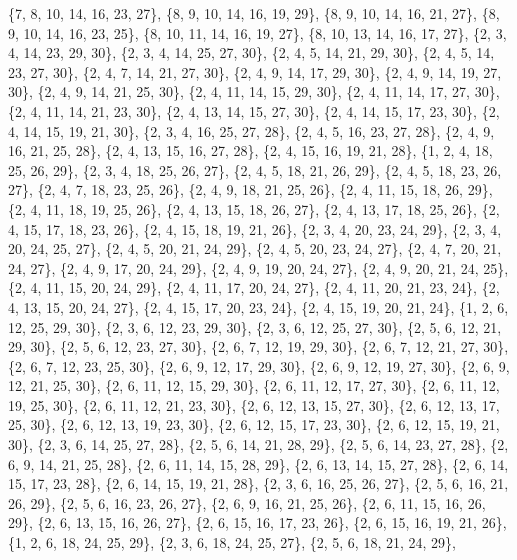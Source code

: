 \documentclass[11pt,a4paper]{article}
\begin{document}
{\{7, 8, 10, 14, 16, 23, 27\}, \{8, 9, 10, 14, 16, 19, 29\}, \{8, 9, 10, 14, 16, 21, 27\}, \{8, 9, 10, 14, 16, 23, 25\}, \{8, 10, 11, 14, 16, 19, 27\},
\{8, 10, 13, 14, 16, 17, 27\}, \{2, 3, 4, 14, 23, 29, 30\}, \{2, 3, 4, 14, 25, 27, 30\}, \{2, 4, 5, 14, 21, 29, 30\}, \{2, 4, 5, 14, 23, 27, 30\},
\{2, 4, 7, 14, 21, 27, 30\}, \{2, 4, 9, 14, 17, 29, 30\}, \{2, 4, 9, 14, 19, 27, 30\}, \{2, 4, 9, 14, 21, 25, 30\}, \{2, 4, 11, 14, 15, 29, 30\},
\{2, 4, 11, 14, 17, 27, 30\}, \{2, 4, 11, 14, 21, 23, 30\}, \{2, 4, 13, 14, 15, 27, 30\}, \{2, 4, 14, 15, 17, 23, 30\}, \{2, 4, 14, 15, 19, 21, 30\},
\{2, 3, 4, 16, 25, 27, 28\}, \{2, 4, 5, 16, 23, 27, 28\}, \{2, 4, 9, 16, 21, 25, 28\}, \{2, 4, 13, 15, 16, 27, 28\}, \{2, 4, 15, 16, 19, 21, 28\},
\{1, 2, 4, 18, 25, 26, 29\}, \{2, 3, 4, 18, 25, 26, 27\}, \{2, 4, 5, 18, 21, 26, 29\}, \{2, 4, 5, 18, 23, 26, 27\}, \{2, 4, 7, 18, 23, 25, 26\},
\{2, 4, 9, 18, 21, 25, 26\}, \{2, 4, 11, 15, 18, 26, 29\}, \{2, 4, 11, 18, 19, 25, 26\}, \{2, 4, 13, 15, 18, 26, 27\}, \{2, 4, 13, 17, 18, 25, 26\},
\{2, 4, 15, 17, 18, 23, 26\}, \{2, 4, 15, 18, 19, 21, 26\}, \{2, 3, 4, 20, 23, 24, 29\}, \{2, 3, 4, 20, 24, 25, 27\}, \{2, 4, 5, 20, 21, 24, 29\},
\{2, 4, 5, 20, 23, 24, 27\}, \{2, 4, 7, 20, 21, 24, 27\}, \{2, 4, 9, 17, 20, 24, 29\}, \{2, 4, 9, 19, 20, 24, 27\}, \{2, 4, 9, 20, 21, 24, 25\},
\{2, 4, 11, 15, 20, 24, 29\}, \{2, 4, 11, 17, 20, 24, 27\}, \{2, 4, 11, 20, 21, 23, 24\}, \{2, 4, 13, 15, 20, 24, 27\}, \{2, 4, 15, 17, 20, 23, 24\},
\{2, 4, 15, 19, 20, 21, 24\}, \{1, 2, 6, 12, 25, 29, 30\}, \{2, 3, 6, 12, 23, 29, 30\}, \{2, 3, 6, 12, 25, 27, 30\}, \{2, 5, 6, 12, 21, 29, 30\},
\{2, 5, 6, 12, 23, 27, 30\}, \{2, 6, 7, 12, 19, 29, 30\}, \{2, 6, 7, 12, 21, 27, 30\}, \{2, 6, 7, 12, 23, 25, 30\}, \{2, 6, 9, 12, 17, 29, 30\},
\{2, 6, 9, 12, 19, 27, 30\}, \{2, 6, 9, 12, 21, 25, 30\}, \{2, 6, 11, 12, 15, 29, 30\}, \{2, 6, 11, 12, 17, 27, 30\}, \{2, 6, 11, 12, 19, 25, 30\},
\{2, 6, 11, 12, 21, 23, 30\}, \{2, 6, 12, 13, 15, 27, 30\}, \{2, 6, 12, 13, 17, 25, 30\}, \{2, 6, 12, 13, 19, 23, 30\}, \{2, 6, 12, 15, 17, 23, 30\},
\{2, 6, 12, 15, 19, 21, 30\}, \{2, 3, 6, 14, 25, 27, 28\}, \{2, 5, 6, 14, 21, 28, 29\}, \{2, 5, 6, 14, 23, 27, 28\}, \{2, 6, 9, 14, 21, 25, 28\},
\{2, 6, 11, 14, 15, 28, 29\}, \{2, 6, 13, 14, 15, 27, 28\}, \{2, 6, 14, 15, 17, 23, 28\}, \{2, 6, 14, 15, 19, 21, 28\}, \{2, 3, 6, 16, 25, 26, 27\},
\{2, 5, 6, 16, 21, 26, 29\}, \{2, 5, 6, 16, 23, 26, 27\}, \{2, 6, 9, 16, 21, 25, 26\}, \{2, 6, 11, 15, 16, 26, 29\}, \{2, 6, 13, 15, 16, 26, 27\},
\{2, 6, 15, 16, 17, 23, 26\}, \{2, 6, 15, 16, 19, 21, 26\}, \{1, 2, 6, 18, 24, 25, 29\}, \{2, 3, 6, 18, 24, 25, 27\}, \{2, 5, 6, 18, 21, 24, 29\},
}
\end{document}
